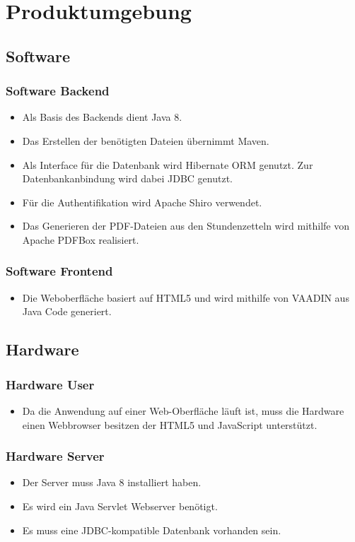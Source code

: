 \section{Produktumgebung}

\subsection{Software}
\subsubsection{Software Backend}
\begin{itemize}
    \item Als Basis des Backends dient Java 8.
    \item Das Erstellen der benötigten Dateien übernimmt Maven.
    \item Als Interface für die Datenbank wird Hibernate ORM genutzt.
            Zur Datenbankanbindung wird dabei JDBC genutzt.
    \item Für die Authentifikation wird Apache Shiro verwendet.
    \item Das Generieren der PDF-Dateien aus den Stundenzetteln wird mithilfe von Apache PDFBox realisiert.
\end{itemize}

\subsubsection{Software Frontend}
\begin{itemize}
    \item Die Weboberfläche basiert auf HTML5 und wird mithilfe von VAADIN aus Java Code generiert.
\end{itemize}

\subsection{Hardware}
\subsubsection{Hardware User}
\begin{itemize}
    \item Da die Anwendung auf einer Web-Oberfläche läuft ist, muss die Hardware einen Webbrowser besitzen der HTML5 und JavaScript unterstützt.
\end{itemize}

\subsubsection{Hardware Server}
\begin{itemize}
    \item Der Server muss Java 8 installiert haben.
    \item Es wird ein Java Servlet Webserver benötigt.
    \item Es muss eine JDBC-kompatible Datenbank vorhanden sein.
\end{itemize}
